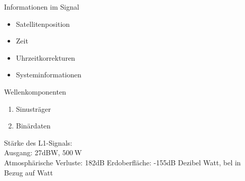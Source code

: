 \begin{multicols}{2}
    Informationen im Signal
    \begin{itemize}
        \item Satellitenposition
        \item Zeit
        \item Uhrzeitkorrekturen
        \item Systeminformationen
    \end{itemize}
    \columnbreak
    Wellenkomponenten
    \begin{enumerate}
        \item Sinusträger
        \item Binärdaten
    \end{enumerate}
\end{multicols}
Stärke des L1-Signals:\\
Ausgang: 27dBW, $\SI{500}{\watt}$\\
Atmosphärische Verluste: 182dB
Erdoberfläche: -155dB
Dezibel Watt, bel in Bezug auf Watt
